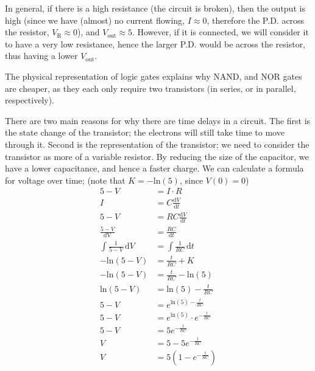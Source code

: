 \documentclass[a4paper, 12pt]{article}
\newcommand{\indefint}[2]{\int #1 \, \mathrm{d}#2}
\newcommand{\dif}[2]{\frac{\mathrm{d}#1}{\mathrm{d}#2}}
\begin{document}
            In general, if there is a high resistance (the circuit is broken), then the output is high (since we have (almost) no current flowing, $I \approx 0$, therefore the P.D. across the resistor, $V_\text{R} \approx 0$), and $V_\text{out} \approx 5$. However, if it is connected, we will consider it to have a very low resistance, hence the larger P.D. would be across the resistor, thus having a lower $V_\text{out}$.
            \medskip

            The physical representation of logic gates explains why NAND, and NOR gates are cheaper, as they each only require two transistors (in series, or in parallel, respectively).
            \medskip

            There are two main reasons for why there are time delays in a circuit. The first is the state change of the transistor; the electrons will still take time to move through it. Second is the representation of the transistor; we need to consider the transistor as more of a variable resistor. By reducing the size of the capacitor, we have a lower capacitance, and hence a faster charge. We can calculate a formula for voltage over time; (note that $K = -\mathrm{ln}(5)$, since $V(0) = 0$)
            \begin{align*}
                5 - V & = I \cdot R \\
                I & = C \dif{V}{t} \\
                5 - V & = RC \dif{V}{t} \\
                \frac{5 - V}{\mathrm{dV}} & = \frac{RC}{\mathrm{d}t} \\
                \indefint{\frac{1}{5 - V}}{V} & = \indefint{\frac{1}{RC}}{t} \\
                -\mathrm{ln}(5 - V) & = \frac{t}{RC} + K \\
                -\mathrm{ln}(5 - V) & = \frac{t}{RC} - \mathrm{ln}(5) \\
                \mathrm{ln}(5 - V) & = \mathrm{ln}(5) - \frac{t}{RC} \\
                5 - V & = e^{\mathrm{ln}(5) - \frac{t}{RC}} \\
                5 - V & = e^{\mathrm{ln}(5)} \cdot e^{-\frac{t}{RC}} \\
                5 - V & = 5e^{-\frac{t}{RC}} \\
                V & = 5 - 5e^{-\frac{t}{RC}} \\
                V & = 5(1 - e^{-\frac{t}{RC}})
            \end{align*}
\end{document}
